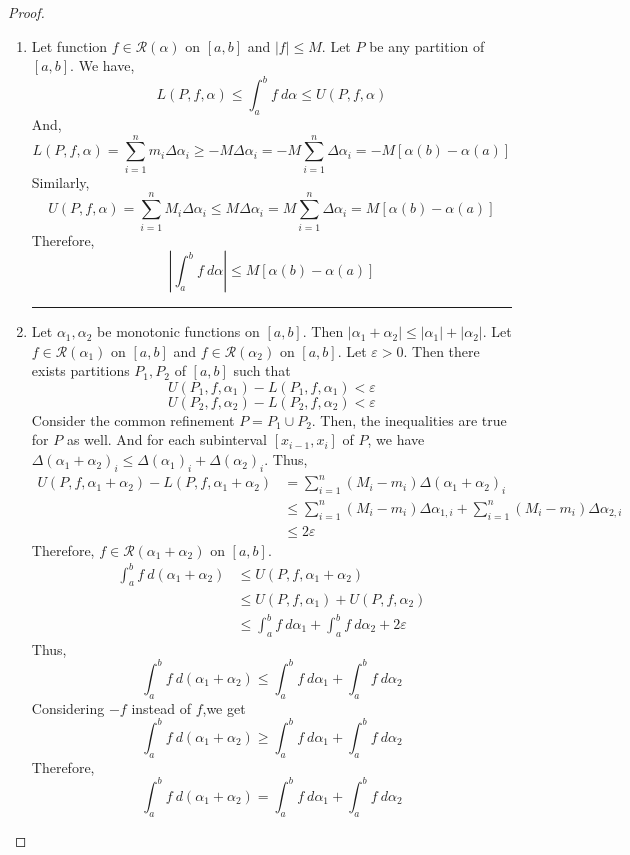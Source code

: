 \begin{proof}
\begin{enumerate}
	\hrule \vspace{1em}
	\item
	Let function $f \in \mathscr{R}(\alpha)$ on $[a,b]$ and $|f| \le M$.
	Let $P$ be any partition of $[a,b]$.
	We have, 
	\[ L(P,f,\alpha) \le \int_a^b f\ d\alpha \le U(P,f,\alpha)\]
	And,
	\[ L(P,f,\alpha) = \sum_{i=1}^n m_i \Delta \alpha_i \ge -M\Delta \alpha_i = -M \sum_{i=1}^n \Delta \alpha_i = -M[\alpha(b)-\alpha(a)] \]
	Similarly,
	\[ U(P,f,\alpha) = \sum_{i=1}^n M_i \Delta \alpha_i \le M\Delta \alpha_i = M \sum_{i=1}^n \Delta \alpha_i = M[\alpha(b)-\alpha(a)] \]
	Therefore,
	\[ \left| \int_a^b f\ d\alpha \right| \le M[\alpha(b)-\alpha(a)] \]
		
	\hrule \vspace{1em}
	\item
	Let $\alpha_1,\alpha_2$ be monotonic functions on $[a,b]$.
	Then $|\alpha_1 + \alpha_2 | \le |\alpha_1| + |\alpha_2|$.
	Let $f \in \mathscr{R}(\alpha_1)$ on $[a,b]$ and $f \in \mathscr{R}(\alpha_2)$ on $[a,b]$.
	Let $\varepsilon > 0$.
	Then there exists partitions $P_1,P_2$ of $[a,b]$ such that
	\[ U(P_1,f,\alpha_1) - L(P_1,f,\alpha_1) < \varepsilon \]
	\[ U(P_2,f,\alpha_2) - L(P_2,f,\alpha_2) < \varepsilon \]
	Consider the common refinement $P = P_1 \cup P_2$.
	Then, the inequalities are true for $P$ as well.
	And for each subinterval $[x_{i-1},x_i]$ of $P$, we have $\Delta(\alpha_1+\alpha_2)_i \le \Delta (\alpha_1)_i + \Delta (\alpha_2)_i$.
	Thus,
	\begin{align*}
	U(P,f,\alpha_1+\alpha_2) - L(P,f,\alpha_1+\alpha_2)
		& = \sum_{i=1}^n (M_i-m_i) \Delta (\alpha_1+\alpha_2)_i \\
		& \le \sum_{i=1}^n (M_i - m_i) \Delta \alpha_{1,i} + \sum_{i=1}^n (M_i-m_i) \Delta \alpha_{2,i} \\
		& \le 2\varepsilon
	\end{align*}
	Therefore, $f \in \mathscr{R}(\alpha_1+\alpha_2)$ on $[a,b]$.
	\begin{align*}
	\int_a^b f\ d(\alpha_1+\alpha_2) 
		& \le U(P,f,\alpha_1+\alpha_2) \\
		& \le U(P,f,\alpha_1) + U(P,f,\alpha_2) \\
		& \le \int_a^b f\ d\alpha_1 + \int_a^b f\ d\alpha_2 + 2\varepsilon
	\end{align*}
	Thus,
	\[ \int_a^b f\ d(\alpha_1+\alpha_2) \le \int_a^b f\ d\alpha_1 + \int_a^b f\ d\alpha_2 \]
	Considering $-f$ instead of $f$,we get
	\[ \int_a^b f\ d(\alpha_1+\alpha_2) \ge \int_a^b f\ d\alpha_1 + \int_a^b f\ d\alpha_2 \]
	Therefore,
	\[ \int_a^b f\ d(\alpha_1+\alpha_2) = \int_a^b f\ d\alpha_1 + \int_a^b f\ d\alpha_2 \]


\end{enumerate}
\end{proof}
